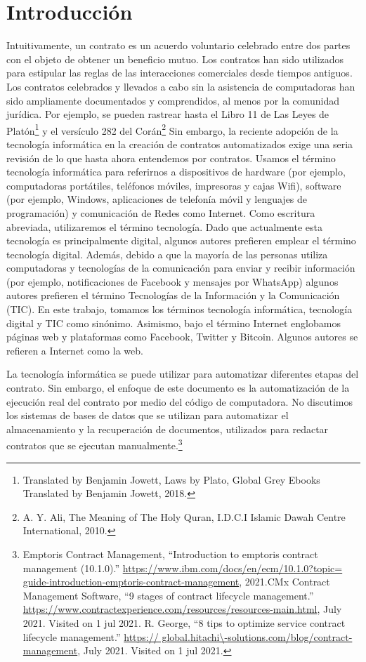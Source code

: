 \documentclass[12pt]{report} %
\begin{document}
\section{Introducción}

Intuitivamente, un contrato es un acuerdo voluntario celebrado entre dos partes con el objeto de obtener un beneficio mutuo. Los contratos han sido utilizados para estipular las reglas de las interacciones comerciales desde tiempos antiguos. Los contratos celebrados y llevados a cabo sin la asistencia de computadoras han sido ampliamente documentados y comprendidos, al menos por la comunidad jurídica. Por ejemplo, se pueden rastrear hasta el Libro 11 de Las Leyes de Platón\footnote{Translated by Benjamin Jowett, Laws by Plato, Global Grey Ebooks Translated by Benjamin Jowett, 2018.}  y el versículo 282 del Corán\footnote{A. Y. Ali, The Meaning of The Holy Quran, I.D.C.I Islamic Dawah Centre International, 2010.} Sin embargo, la reciente adopción de la tecnología informática en la creación de contratos automatizados exige una seria revisión de lo que hasta ahora entendemos por contratos. Usamos el término tecnología informática para referirnos a dispositivos de hardware (por ejemplo, computadoras portátiles, teléfonos móviles, impresoras y cajas Wifi), software (por ejemplo, Windows, aplicaciones de telefonía móvil y lenguajes de programación) y comunicación de Redes como Internet. Como escritura abreviada, utilizaremos el término tecnología. Dado que actualmente esta tecnología es principalmente digital, algunos autores prefieren emplear el término tecnología digital. Además, debido a que la mayoría de las personas utiliza computadoras y tecnologías de la comunicación para enviar y recibir información (por ejemplo, notificaciones de Facebook y mensajes por WhatsApp) algunos autores prefieren el término Tecnologías de la Información y la Comunicación (TIC). En este trabajo, tomamos los términos tecnología informática, tecnología digital y TIC como sinónimo. Asimismo, bajo el término Internet englobamos páginas web y plataformas como Facebook, Twitter y Bitcoin. Algunos autores se refieren a Internet como la web.

La tecnología informática se puede utilizar para automatizar diferentes etapas del contrato. Sin embargo, el enfoque de este documento es la automatización de la ejecución real del contrato por medio del código de computadora. No discutimos los sistemas de bases de datos que se utilizan para automatizar el almacenamiento y la recuperación de documentos, utilizados para redactar contratos que se ejecutan manualmente.\footnote{Emptoris Contract Management, “Introduction to emptoris contract management (10.1.0).” \url{https://www.ibm.com/docs/en/ecm/10.1.0?topic= guide-introduction-emptoris-contract-management},
2021.CMx Contract Management Software, “9 stages of contract lifecycle management.” \url{https://www.contractexperience.com/resources/resources-main.html}, July 2021. Visited on 1 jul 2021.  R. George, “8 tips to optimize service contract lifecycle management.” \url{https:// global.hitachi\-solutions.com/blog/contract-management}, July 2021. Visited on 1 jul 2021.} 
\end{document}
